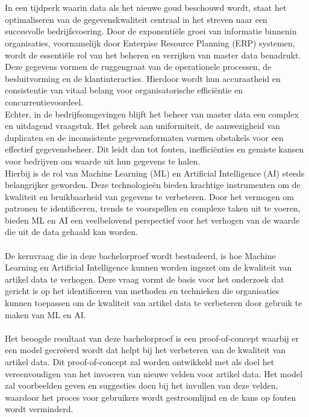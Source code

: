 
\chapter{}%
\label{ch:inleiding}

In een tijdperk waarin data als het nieuwe goud beschouwd wordt, staat het optimaliseren van de gegevenskwaliteit centraal in het streven naar een succesvolle bedrijfsvoering. Door de exponentiële groei van informatie binnenin organisaties, voornamelijk door Enterpise Resource Planning (ERP) systemen, wordt de essentiële rol van het beheren en verrijken van master data benadrukt. Deze gegevens vormen de ruggengraat van de operationele processen, de besluitvorming en de klantinteracties. Hierdoor wordt hun accuraatheid en consistentie van vitaal belang voor organisatorische efficiëntie en concurrentievoordeel.
\\
Echter, in de bedrijfsomgevingen blijft het beheer van master data een complex en uitdagend vraagstuk. Het gebrek aan uniformiteit, de aanwezigheid van duplicaten en de inconsistente gegevensformaten vormen obstakels voor een effectief gegevensbeheer. Dit leidt dan tot fouten, inefficiënties en gemiste kansen voor bedrijven om waarde uit hun gegevens te halen. 
\\
Hierbij is de rol van Machine Learning (ML) en Artificial Intelligence (AI) steeds belangrijker geworden. Deze technologieën bieden krachtige instrumenten om de kwaliteit en bruikbaarheid van gegevens te verbeteren. Door het vermogen om patronen te identificeren, trends te voorspellen en complexe taken uit te voeren, bieden ML en AI een veelbelovend perspectief voor het verhogen van de waarde die uit de data gehaald kan worden.
\\ \\
De kernvraag die in deze bachelorproef wordt bestudeerd, is hoe Machine Learning en Artificial Intelligence kunnen worden ingezet om de kwaliteit van artikel data te verhogen. Deze vraag vormt de basis voor het onderzoek dat gericht is op het identificeren van methoden en technieken die organisaties kunnen toepassen om de kwaliteit van artikel data te verbeteren door gebruik te maken van ML en AI.
\\ \\
Het beoogde resultaat van deze bachelorproef is een proof-of-concept waarbij er een model gecreëerd wordt dat helpt bij het verbeteren van de kwaliteit van artikel data. Dit proof-of-concept zal worden ontwikkeld met als doel het vereenvoudigen van het invoeren van nieuwe velden voor artikel data. Het model zal voorbeelden geven en suggesties doen bij het invullen van deze velden, waardoor het proces voor gebruikers wordt gestroomlijnd en de kans op fouten wordt verminderd.
